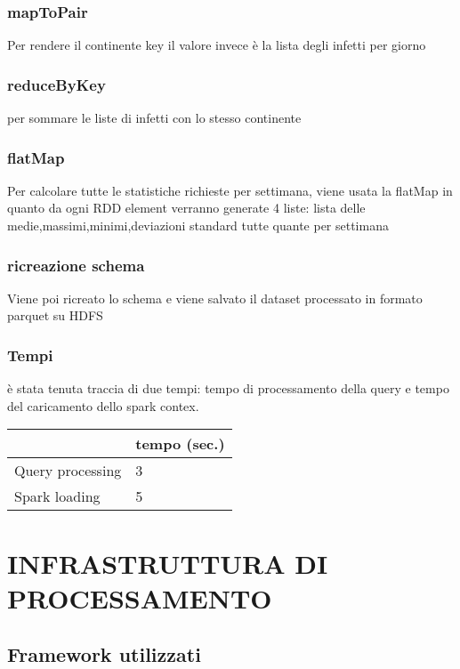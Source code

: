 \documentclass[acmsmall]{acmart}
\begin{document}
\subsubsection{mapToPair}
Per rendere il continente key il valore invece è la lista degli infetti per giorno 
\subsubsection{reduceByKey}
per sommare le liste di infetti con lo stesso continente

\subsubsection{flatMap}
Per calcolare tutte le statistiche richieste per settimana, viene usata la flatMap in quanto da ogni RDD element verranno generate 4 liste:
lista delle medie,massimi,minimi,deviazioni standard tutte quante per settimana 
\subsubsection{ricreazione schema}
Viene poi ricreato lo schema e viene salvato il dataset processato in formato parquet su HDFS

\subsubsection{Tempi}
è stata tenuta traccia di due tempi: tempo di processamento della query e tempo del caricamento dello spark contex.

\hspace{40mm} \begin{tabular}{l|l|}
\cline{2-2}
                                       & tempo (sec.) \\ \hline
\multicolumn{1}{|l|}{Query processing} & 3            \\ \hline
\multicolumn{1}{|l|}{Spark loading}    & 5            \\ \hline
\end{tabular}


\section{INFRASTRUTTURA DI PROCESSAMENTO}


\subsection{Framework utilizzati}
\end{document}
